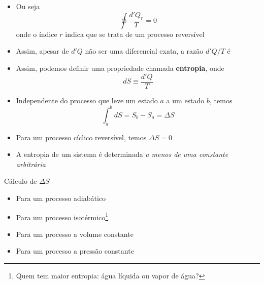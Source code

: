 \documentclass[t,%
brazilian,%
11pt,%
aspectratio=169,%
table%
]{beamer}
\begin{document}
\begin{frame}
    \begin{itemize}
        \item Ou seja
            \[
                \oint {\frac{d'Q_r}{T}} = 0
            \]
            onde o índice \(r\) indica que se trata de um processo reversível
        \item Assim, apesar de \(d'Q\) não ser uma diferencial exata, a razão \(d'Q/T\) é
        \item Assim, podemos definir uma propriedade chamada \textbf{entropia}, onde
            \[
                dS \equiv \frac{d'Q}{T}
            \]
        \item Independente do processo que leve um estado \(a\) a um estado \(b\), temos 
            \[
                \int_{a}^{b} dS=S_b - S_a = \Delta S
            \]
        \item Para um processo cíclico reversível, temos \(\Delta S=0\)
        \item A entropia de um sistema é determinada \textit{a menos de uma constante arbitrária}

    \end{itemize}
\end{frame}

\begin{frame}{Cálculo de \(\Delta S\)}
    \begin{itemize}
        \item Para um processo adiabático
        \item Para um processo isotérmico\footnote{Quem tem maior entropia: água líquida ou vapor de água?}
        \item Para um processo a volume constante
        \item Para um processo a pressão constante
    \end{itemize}
\end{frame}
\end{document}
